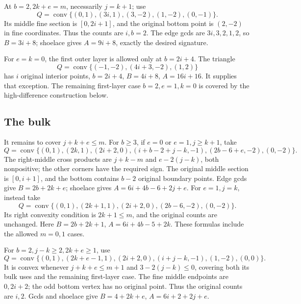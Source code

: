 \documentclass[11pt]{article}
\newcommand{\conv}{\operatorname{conv}}
\begin{document}
At \(b=2,2k+e=m\), necessarily \(j=k+1\); use
\begin{equation}\label{eq:b2cap}
 Q=\conv\{(0,1),(3i,1),(3,-2),(1,-2),(0,-1)\}.
\end{equation}
Its middle fine section is \([0,2i+1]\), and the original bottom point
is \((2,-2)\) in fine coordinates. Thus the counts are \(i,b=2\).
The edge gcds are \(3i,3,2,1,2\), so \(B=3i+8\);
shoelace gives \(A=9i+8\), exactly the desired signature.

For \(e=k=0\), the first outer layer is allowed only at \(b=2i+4\).
The triangle
\[
 Q=\conv\{(-1,-2),(4i+3,-2),(1,2)\}
\]
has \(i\) original interior points, \(b=2i+4\), \(B=4i+8\),
\(A=16i+16\). It supplies that exception.
The remaining first-layer case \(b=2,e=1,k=0\) is covered by the
high-difference construction below.

\subsection{The bulk}
It remains to cover \(j+k+e\le m\).
For \(b\ge3\), if \(e=0\) or \(e=1,j\ge k+1\), take
\[
 Q=\conv\{(0,1),(2k,1),(2i+2,0),
          (i+b-2+j-k,-1),(2b-6+e,-2),(0,-2)\}.
\]
The right-middle cross products are \(j+k-m\) and \(e-2(j-k)\),
both nonpositive; the other corners have the required sign.
The original middle section is \([0,i+1]\), and the bottom contains
\(b-2\) original boundary points.
Edge gcds give \(B=2b+2k+e\); shoelace gives
\(A=6i+4b-6+2j+e\).
For \(e=1,j=k\), instead take
\[
 Q=\conv\{(0,1),(2k+1,1),(2i+2,0),(2b-6,-2),(0,-2)\}.
\]
Its right convexity condition is \(2k+1\le m\), and the original counts
are unchanged. Here \(B=2b+2k+1\), \(A=6i+4b-5+2k\).
These formulas include the allowed \(m=0,1\) cases.

For \(b=2,j-k\ge2,2k+e\ge1\), use
\begin{equation}\label{eq:highdiff}
 Q=\conv\{(0,1),(2k+e-1,1),(2i+2,0),
          (i+j-k,-1),(1,-2),(0,0)\}.
\end{equation}
It is convex whenever \(j+k+e\le m+1\) and \(3-2(j-k)\le0\),
covering both its bulk uses and the remaining first-layer case.
The fine middle endpoints are \(0,2i+2\); the odd bottom vertex
has no original point. Thus the original counts are \(i,2\).
Gcds and shoelace give \(B=4+2k+e\), \(A=6i+2+2j+e\).
\end{document}
